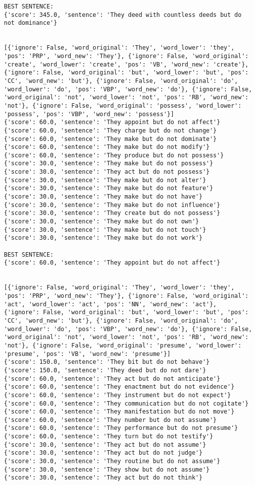 \documentclass[12pt,a4paper,oneside]{book}
\begin{document}
\begin{verbatim}
BEST SENTENCE:
{'score': 345.0, 'sentence': 'They deed with countless deeds but do not dominance'}


[{'ignore': False, 'word_original': 'They', 'word_lower': 'they', 'pos': 'PRP', 'word_new': 'They'}, {'ignore': False, 'word_original': 'create', 'word_lower': 'create', 'pos': 'VB', 'word_new': 'create'}, {'ignore': False, 'word_original': 'but', 'word_lower': 'but', 'pos': 'CC', 'word_new': 'but'}, {'ignore': False, 'word_original': 'do', 'word_lower': 'do', 'pos': 'VBP', 'word_new': 'do'}, {'ignore': False, 'word_original': 'not', 'word_lower': 'not', 'pos': 'RB', 'word_new': 'not'}, {'ignore': False, 'word_original': 'possess', 'word_lower': 'possess', 'pos': 'VBP', 'word_new': 'possess'}]
{'score': 60.0, 'sentence': 'They appoint but do not affect'}
{'score': 60.0, 'sentence': 'They charge but do not change'}
{'score': 60.0, 'sentence': 'They make but do not dominate'}
{'score': 60.0, 'sentence': 'They make but do not modify'}
{'score': 60.0, 'sentence': 'They produce but do not possess'}
{'score': 30.0, 'sentence': 'They make but do not possess'}
{'score': 30.0, 'sentence': 'They act but do not possess'}
{'score': 30.0, 'sentence': 'They make but do not alter'}
{'score': 30.0, 'sentence': 'They make but do not feature'}
{'score': 30.0, 'sentence': 'They make but do not have'}
{'score': 30.0, 'sentence': 'They make but do not influence'}
{'score': 30.0, 'sentence': 'They create but do not possess'}
{'score': 30.0, 'sentence': 'They make but do not own'}
{'score': 30.0, 'sentence': 'They make but do not touch'}
{'score': 30.0, 'sentence': 'They make but do not work'}

BEST SENTENCE:
{'score': 60.0, 'sentence': 'They appoint but do not affect'}


[{'ignore': False, 'word_original': 'They', 'word_lower': 'they', 'pos': 'PRP', 'word_new': 'They'}, {'ignore': False, 'word_original': 'act', 'word_lower': 'act', 'pos': 'NN', 'word_new': 'act'}, {'ignore': False, 'word_original': 'but', 'word_lower': 'but', 'pos': 'CC', 'word_new': 'but'}, {'ignore': False, 'word_original': 'do', 'word_lower': 'do', 'pos': 'VBP', 'word_new': 'do'}, {'ignore': False, 'word_original': 'not', 'word_lower': 'not', 'pos': 'RB', 'word_new': 'not'}, {'ignore': False, 'word_original': 'presume', 'word_lower': 'presume', 'pos': 'VB', 'word_new': 'presume'}]
{'score': 150.0, 'sentence': 'They bit but do not behave'}
{'score': 150.0, 'sentence': 'They deed but do not dare'}
{'score': 60.0, 'sentence': 'They act but do not anticipate'}
{'score': 60.0, 'sentence': 'They enactment but do not evidence'}
{'score': 60.0, 'sentence': 'They instrument but do not expect'}
{'score': 60.0, 'sentence': 'They communication but do not cogitate'}
{'score': 60.0, 'sentence': 'They manifestation but do not move'}
{'score': 60.0, 'sentence': 'They number but do not assume'}
{'score': 60.0, 'sentence': 'They performance but do not presume'}
{'score': 60.0, 'sentence': 'They turn but do not testify'}
{'score': 30.0, 'sentence': 'They act but do not assume'}
{'score': 30.0, 'sentence': 'They act but do not judge'}
{'score': 30.0, 'sentence': 'They routine but do not assume'}
{'score': 30.0, 'sentence': 'They show but do not assume'}
{'score': 30.0, 'sentence': 'They act but do not think'}


\end{verbatim}
\end{document}
